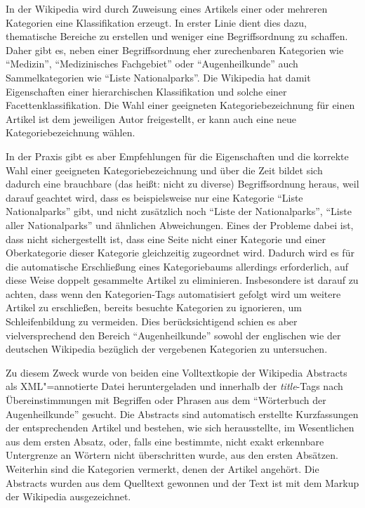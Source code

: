 \documentclass[pagesize,paper=A4,DIV=calc,fontsize=12pt,draft=false]{scrreprt}
\begin{document}
In der Wikipedia wird durch Zuweisung eines Artikels einer oder mehreren Kategorien eine Klassifikation erzeugt. 
In erster Linie dient dies dazu, thematische Bereiche zu erstellen und weniger eine Begriffsordnung zu schaffen. 
Daher gibt es, neben einer Begriffsordnung eher zurechenbaren Kategorien wie \enquote{Medizin}, \enquote{Medizinisches Fachgebiet} oder \enquote{Augenheilkunde} auch Sammelkategorien wie \enquote{Liste Nationalparks}. 
Die Wikipedia hat damit Eigenschaften einer hierarchischen Klassifikation und solche einer Facettenklassifikation. 
Die Wahl einer geeigneten Kategoriebezeichnung für einen Artikel ist dem jeweiligen Autor freigestellt, er kann auch eine neue Kategoriebezeichnung wählen. 

In der Praxis gibt es aber Empfehlungen für die Eigenschaften und die korrekte Wahl einer geeigneten Kategoriebezeichnung und über die Zeit bildet sich dadurch eine brauchbare (das heißt: nicht zu diverse) Begriffsordnung heraus, weil darauf geachtet wird, dass es beispielsweise nur eine Kategorie \enquote{Liste Nationalparks} gibt, und nicht zusätzlich noch \enquote{Liste der Nationalparks}, \enquote{Liste aller Nationalparks} und ähnlichen Abweichungen. 
Eines der Probleme dabei ist, dass nicht sichergestellt ist, dass eine Seite nicht einer Kategorie und einer Oberkategorie dieser Kategorie gleichzeitig zugeordnet wird. 
Dadurch wird es für die automatische Erschließung eines Kategoriebaums allerdings erforderlich, auf diese Weise doppelt gesammelte Artikel zu eliminieren. 
Insbesondere ist darauf zu achten, dass wenn den Kategorien-Tags automatisiert gefolgt wird um weitere Artikel zu erschließen, bereits besuchte Kategorien zu ignorieren, um Schleifenbildung zu vermeiden. 
Dies berücksichtigend schien es aber vielversprechend den Bereich \enquote{Augenheilkunde} sowohl der englischen wie der deutschen Wikipedia bezüglich der vergebenen Kategorien zu untersuchen. 

Zu diesem Zweck wurde von beiden eine Volltextkopie der Wikipedia Abstracts als XML"=annotierte Datei heruntergeladen und innerhalb der \emph{title}-Tags nach Übereinstimmungen mit Begriffen oder Phrasen aus dem \enquote{Wörterbuch der Augenheilkunde} gesucht. 
Die Abstracts sind automatisch erstellte Kurzfassungen der entsprechenden Artikel und bestehen, wie sich herausstellte, im Wesentlichen aus dem ersten Absatz, oder, falls eine bestimmte, nicht exakt erkennbare Untergrenze an Wörtern nicht überschritten wurde, aus den ersten Absätzen. 
Weiterhin sind die Kategorien vermerkt, denen der Artikel angehört. 
Die Abstracts wurden aus dem Quelltext gewonnen und der Text ist mit dem Markup der Wikipedia ausgezeichnet. 
\end{document}
